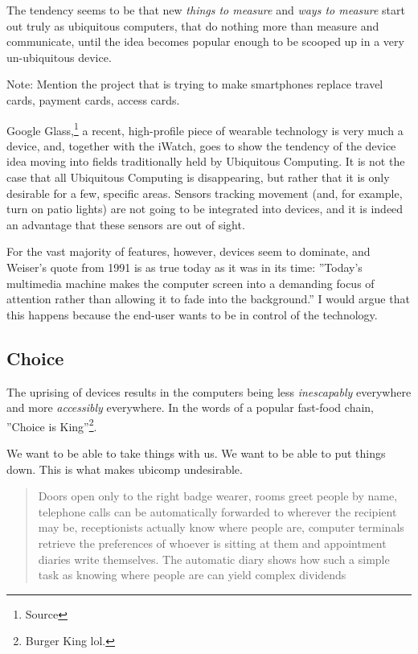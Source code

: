 The tendency seems to be that new \emph{things to measure} and \emph{ways to measure} start out truly as ubiquitous computers, that do
nothing more than measure and communicate, until the idea becomes popular enough to be scooped up in a very un-ubiquitous device.

Note: Mention the project that is trying to make smartphones replace travel cards, payment cards, access cards.

Google Glass,\footnote{Source} a recent, high-profile piece of wearable technology is very much a device, and, together with the iWatch,
goes to show the tendency of the device idea moving into fields traditionally held by Ubiquitous Computing. It is not the case that all
Ubiquitous Computing is disappearing, but rather that it is only desirable for a few, specific areas. Sensors tracking movement (and, for
example, turn on patio lights) are not going to be integrated into devices, and it is indeed an advantage that these sensors are out of sight.

For the vast majority of features, however, devices seem to dominate, and Weiser's quote from 1991 is as true today as it was in its
time: ''Today's multimedia machine makes the computer screen into a demanding focus of attention rather than allowing it to fade into the
background.''\cite{weiser91} I would argue that this happens because the end-user wants to be in control of the technology.

\subsection*{Choice}

The uprising of devices results in the computers being less \emph{inescapably} everywhere and more \emph{accessibly} everywhere. In the words
of a popular fast-food chain, ''Choice is King''\footnote{Burger King lol.}.

We want to be able to take things with us. We want to be able to put things down. This is what makes ubicomp undesirable.

\begin{quote}
    Doors open only to the right badge wearer, rooms greet people by name, telephone calls can be automatically forwarded to wherever the recipient may be, receptionists actually know where people are, computer terminals retrieve the preferences of whoever is sitting at them and appointment diaries write themselves. The automatic diary shows how such a simple task as knowing where people are can yield complex dividends\cite{weiser91}
\end{quote}

